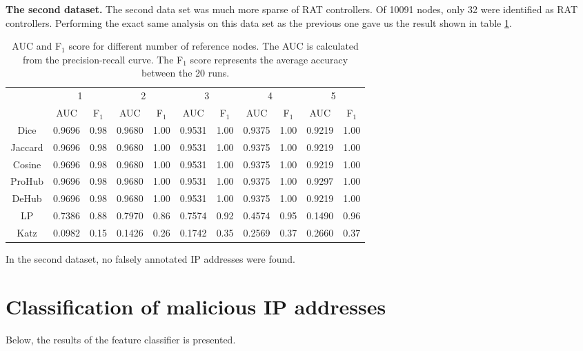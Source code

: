\textbf{The second dataset.} The second data set was much more sparse of RAT controllers. Of 10091 nodes, only 32 were identified as RAT controllers. Performing the exact same analysis on this data set as the previous one gave us the result shown in table \ref{aucIndex2}.

\begin{table}[h!]
    \centering
    \caption{AUC and F$_1$ score for different number of reference nodes. The AUC is calculated from the precision-recall curve. The F$_1$ score represents the average accuracy between the 20 runs.}
    \begin{tabular}{|c||c|c||c|c||c|c||c|c||c|c|}
      \hline
      \multirow{2}{*}{~} 
            & \multicolumn{2}{c||}{1}
            & \multicolumn{2}{c||}{2}
            & \multicolumn{2}{c||}{3}
            & \multicolumn{2}{c||}{4}
            & \multicolumn{2}{|c|}{5} \\             \cline{2-11}
      ~     &AUC&F$_1$&AUC&F$_1$&AUC&F$_1$&AUC&F$_1$&AUC&F$_1$ \\ \hline
    Dice    & 0.9696 & 0.98 & 0.9680 & 1.00 & 0.9531 & 1.00 & 0.9375 & 1.00 & 0.9219 & 1.00 \\
    Jaccard & 0.9696 & 0.98 & 0.9680 & 1.00 & 0.9531 & 1.00 & 0.9375 & 1.00 & 0.9219 & 1.00 \\
    Cosine  & 0.9696 & 0.98 & 0.9680 & 1.00 & 0.9531 & 1.00 & 0.9375 & 1.00 & 0.9219 & 1.00 \\
    ProHub  & 0.9696 & 0.98 & 0.9680 & 1.00 & 0.9531 & 1.00 & 0.9375 & 1.00 & 0.9297 & 1.00 \\
    DeHub   & 0.9696 & 0.98 & 0.9680 & 1.00 & 0.9531 & 1.00 & 0.9375 & 1.00 & 0.9219 & 1.00 \\ 
    LP      & 0.7386 & 0.88 & 0.7970 & 0.86 & 0.7574 & 0.92 & 0.4574 & 0.95 & 0.1490 & 0.96 \\
    Katz    & 0.0982 & 0.15 & 0.1426 & 0.26 & 0.1742 & 0.35 & 0.2569 & 0.37 & 0.2660 & 0.37 \\ \hline
    \end{tabular}
    \label{aucIndex2}
\end{table}

In the second dataset, no falsely annotated IP addresses were found. 

\nopagebreak
\FloatBarrier
\section{Classification of malicious IP addresses}
Below, the results of the feature classifier is presented. 

